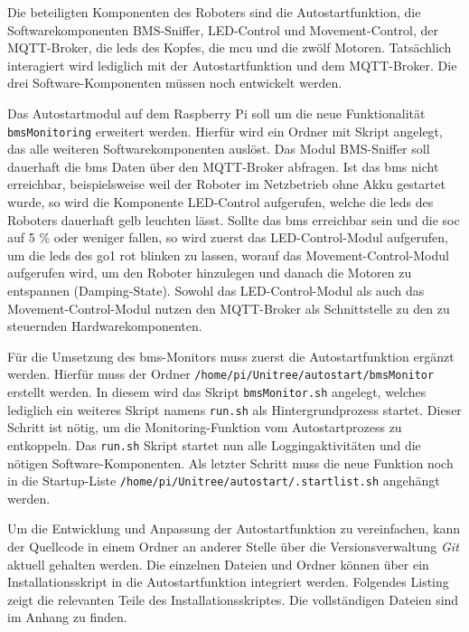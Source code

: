 \noindent Die beteiligten Komponenten des Roboters sind die Autostartfunktion, die Softwarekomponenten BMS-\allowbreak Sniffer, LED-\allowbreak Control
und Movement-Control, der MQTT-Broker, die \glspl{led} des Kopfes, die \gls{mcu} und die zwölf Motoren.
Tatsächlich interagiert wird lediglich mit der Autostartfunktion und dem MQTT-Broker. Die drei Software-Komponenten müssen
noch entwickelt werden.

Das Autostartmodul auf dem Raspberry Pi soll um die neue Funktionalität \texttt{bmsMonitoring} erweitert werden.
Hierfür wird ein Ordner mit Skript angelegt, das alle weiteren Softwarekomponenten auslöst.
Das Modul BMS-Sniffer soll dauerhaft die \gls{bms} Daten über den MQTT-Broker abfragen.
Ist das \gls{bms} nicht erreichbar, beispielsweise weil der Roboter im Netzbetrieb ohne Akku gestartet wurde,
so wird die Komponente LED-Control aufgerufen, welche die \glspl{led} des Roboters dauerhaft gelb leuchten lässt.
Sollte das \gls{bms} erreichbar sein und die \gls{soc} auf \num{5} \% oder weniger fallen, so wird zuerst das LED-Control-Modul
aufgerufen, um die \glspl{led} des \gls{go1} rot blinken zu lassen, worauf das Movement-Control-Modul aufgerufen wird,
um den Roboter hinzulegen und danach die Motoren zu entspannen (Damping-State).
Sowohl das LED-Control-Modul als auch das Movement-Control-Modul nutzen den MQTT-Broker als Schnittstelle zu den zu steuernden
Hardwarekomponenten.


Für die Umsetzung des \gls{bms}-Monitors muss zuerst die Autostartfunktion ergänzt werden.
Hierfür muss der Ordner \texttt{/home/\allowbreak pi/\allowbreak Unitree/\allowbreak autostart/\allowbreak bmsMonitor}
erstellt werden.
In diesem wird das Skript \texttt{bmsMonitor.sh} angelegt, welches lediglich ein weiteres Skript namens \texttt{run.sh}
als Hintergrundprozess startet.
Dieser Schritt ist nötig, um die Monitoring-Funktion vom Autostartprozess zu entkoppeln.
Das \texttt{run.sh} Skript startet nun alle Loggingaktivitäten und die nötigen Software-Komponenten.
Als letzter Schritt muss die neue Funktion noch in die Startup-Liste
\texttt{/home/pi/Unitree/autostart/.startlist.sh}
angehängt werden.

Um die Entwicklung und Anpassung der Autostartfunktion zu vereinfachen, kann der Quellcode in einem Ordner an anderer
Stelle über die Versionsverwaltung \emph{Git} aktuell gehalten werden.
Die einzelnen Dateien und Ordner können über ein Installationsskript in die Autostartfunktion integriert werden.
Folgendes Listing zeigt die relevanten Teile des Installationsskriptes.
Die vollständigen Dateien sind im Anhang zu finden.

